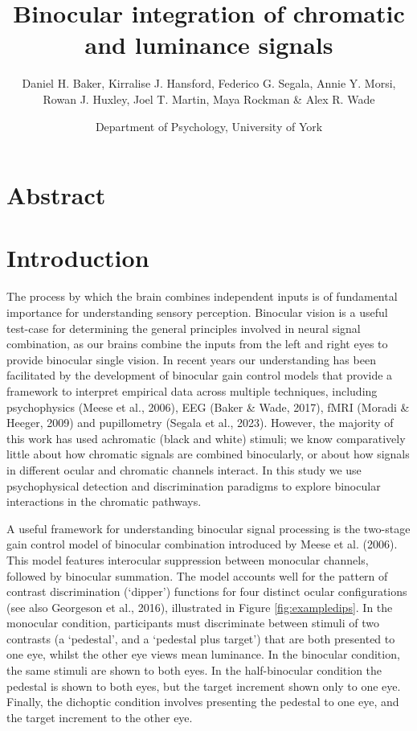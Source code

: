 \documentclass[
]{article}
\title{Binocular integration of chromatic and luminance signals}
\author{Daniel H. Baker, Kirralise J. Hansford, Federico G. Segala, Annie Y. Morsi,\\
Rowan J. Huxley, Joel T. Martin, Maya Rockman \& Alex R. Wade}
\date{Department of Psychology, University of York}
\begin{document}
\maketitle

\hypertarget{abstract}{%
\section{Abstract}\label{abstract}}

\hypertarget{introduction}{%
\section{Introduction}\label{introduction}}

The process by which the brain combines independent inputs is of fundamental importance for understanding sensory perception. Binocular vision is a useful test-case for determining the general principles involved in neural signal combination, as our brains combine the inputs from the left and right eyes to provide binocular single vision. In recent years our understanding has been facilitated by the development of binocular gain control models that provide a framework to interpret empirical data across multiple techniques, including psychophysics (Meese et al., 2006), EEG (Baker \& Wade, 2017), fMRI (Moradi \& Heeger, 2009) and pupillometry (Segala et al., 2023). However, the majority of this work has used achromatic (black and white) stimuli; we know comparatively little about how chromatic signals are combined binocularly, or about how signals in different ocular and chromatic channels interact. In this study we use psychophysical detection and discrimination paradigms to explore binocular interactions in the chromatic pathways.

A useful framework for understanding binocular signal processing is the two-stage gain control model of binocular combination introduced by Meese et al. (2006). This model features interocular suppression between monocular channels, followed by binocular summation. The model accounts well for the pattern of contrast discrimination (`dipper') functions for four distinct ocular configurations (see also Georgeson et al., 2016), illustrated in Figure \ref{fig:exampledips}. In the monocular condition, participants must discriminate between stimuli of two contrasts (a `pedestal', and a `pedestal plus target') that are both presented to one eye, whilst the other eye views mean luminance. In the binocular condition, the same stimuli are shown to both eyes. In the half-binocular condition the pedestal is shown to both eyes, but the target increment shown only to one eye. Finally, the dichoptic condition involves presenting the pedestal to one eye, and the target increment to the other eye.
\end{document}
